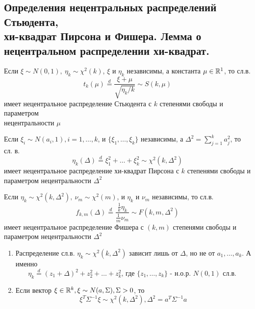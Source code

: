 \subsection{Определения нецентральных распределений Стьюдента, \\
хи-квадрат Пирсона и Фишера.
Лемма о нецентральном распределении хи-квадрат.}
\begin{definition}
        Если \(\xi\sim N(0,1),\ \eta_k\sim\chi^2(k)\), \(\xi\) и \(\eta_k\)
        независимы, а константа \(\mu\in\mathbb{R}^1\), то сл.в.
        \[t_k(\mu)\overset{d}{=}\frac{\xi+\mu}{\sqrt{\eta_k/k}}\sim S(k,\mu)\]
        имеет нецентральное распределение Стьюдента с \(k\) степенями свободы
        и параметром \\ нецентральности \(\mu\)
\end{definition}
\begin{definition}
    Если \(\xi_i\sim N(a_i,1),i=1,\ldots,k\), и \(\{\xi_1,\ldots,\xi_k\}\)
    независимы, а \(\Delta^2=\sum_{j=1}^{k}a_j^2\), то сл. в.
    \[ \eta_k(\Delta)\overset{d}{=}\xi_1^2+\ldots+\xi_k^2\sim\chi^2(k,\Delta^2) \]
    имеет нецентральное распределение хи-квадрат Пирсона с \(k\) степенями свободы
    и параметром нецентральности \(\Delta^2\)
\end{definition}
\begin{definition}
    Если \(\eta_k\sim\chi^2(k,\Delta^2),\ \nu_m\sim\chi^2(m)\), и \(\eta_k\) и \(\nu_m\)
    независимы, то сл.в.
    \[f_{k,m}(\Delta)\overset{d}{=}\frac{\frac{1}{k}\eta_k}{\frac{1}{m}\nu_m}\sim F(k,m,\Delta^2)\]
    имеет нецентральное распределение Фишера с \((k,m)\) степенями свободы и параметром
    нецентральности \(\Delta^2\)
\end{definition}
\begin{lemma} \label{delta_dependency}
    \begin{enumerate}
        \item Распределение сл.в. \(\eta_k\sim\chi^2(k,\Delta^2)\) зависит лишь
            от \(\Delta\), но не от \(a_1,\ldots,a_k\). А именно
            \[\eta_k\overset{d}{=}(z_1+\Delta)^2+z_2^2+\ldots+z_k^2\mbox{, где \(\{z_1,\ldots,z_k\}\) - н.о.р. \(N(0,1)\) сл.в. } \]

        \item Если вектор \(\xi\in\mathbb{R}^k,\xi\sim N(a, \Sigma),\Sigma>0\), то
        \[\xi^T\Sigma^{-1}\xi\sim\chi^2(k,\Delta^2),\Delta^2 = a^{T}\Sigma^{-1}a\]
    \end{enumerate}
\end{lemma}
